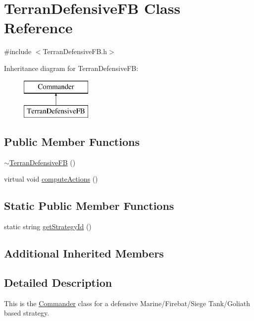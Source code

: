 \hypertarget{class_terran_defensive_f_b}{\section{Terran\-Defensive\-F\-B Class Reference}
\label{class_terran_defensive_f_b}
}


{\ttfamily \#include $<$Terran\-Defensive\-F\-B.\-h$>$}

Inheritance diagram for Terran\-Defensive\-F\-B\-:\begin{figure}[H]
\begin{center}
\leavevmode
\includegraphics[height=2.000000cm]{class_terran_defensive_f_b}
\end{center}
\end{figure}
\subsection*{Public Member Functions}
\begin{DoxyCompactItemize}
\item 
\hyperlink{class_terran_defensive_f_b_a78bc9f5be120acc03e2e250074bbb320}{$\sim$\-Terran\-Defensive\-F\-B} ()
\item 
virtual void \hyperlink{class_terran_defensive_f_b_a4786f11a48862280c0a0ff6bfd8e3a5d}{compute\-Actions} ()
\end{DoxyCompactItemize}
\subsection*{Static Public Member Functions}
\begin{DoxyCompactItemize}
\item 
static string \hyperlink{class_terran_defensive_f_b_ace0eae4a2dd8264deddd48b653b131c1}{get\-Strategy\-Id} ()
\end{DoxyCompactItemize}
\subsection*{Additional Inherited Members}


\subsection{Detailed Description}
This is the \hyperlink{class_commander}{Commander} class for a defensive Marine/\-Firebat/\-Siege Tank/\-Goliath based strategy.

